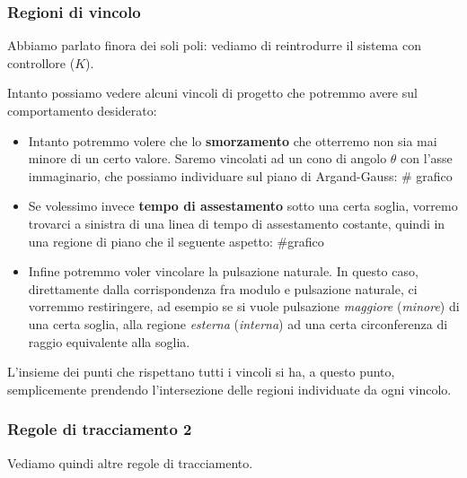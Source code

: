 \documentclass[a4paper,11pt]{article}
\begin{document}
\subsubsection{Regioni di vincolo}
Abbiamo parlato finora dei soli poli: vediamo di reintrodurre il sistema con controllore ($K$). 

Intanto possiamo vedere alcuni vincoli di progetto che potremmo avere sul comportamento desiderato:
\begin{itemize}
	\item 
		Intanto potremmo volere che lo \textbf{smorzamento} che otterremo non sia mai minore di un certo valore. Saremo vincolati ad un cono di angolo $\theta$ con l'asse immaginario, che possiamo individuare sul piano di Argand-Gauss: # grafico

	\item
		Se volessimo invece \textbf{tempo di assestamento} sotto una certa soglia, vorremo trovarci a sinistra di una linea di tempo di assestamento costante, quindi in una regione di piano che il seguente aspetto: #grafico

	\item
		Infine potremmo voler vincolare la pulsazione naturale.
		In questo caso, direttamente dalla corrispondenza fra modulo e pulsazione naturale, ci vorremmo restiringere, ad esempio se si vuole pulsazione \textit{maggiore} (\textit{minore}) di una certa soglia, alla regione \textit{esterna} (\textit{interna}) ad una certa circonferenza di raggio equivalente alla soglia.
\end{itemize}

L'insieme dei punti che rispettano tutti i vincoli si ha, a questo punto, semplicemente prendendo l'intersezione delle regioni individuate da ogni vincolo.

\subsubsection{Regole di tracciamento 2}
Vediamo quindi altre regole di tracciamento.
\end{document}

